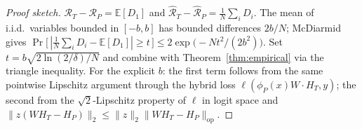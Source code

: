 \begin{proof}[Proof sketch]
$\mathcal{R}_T-\mathcal{R}_P=\mathbb{E}[D_1]$ and
$\widehat{\mathcal{R}}_T-\widehat{\mathcal{R}}_P=\tfrac1N\sum_i D_i$.
The mean of i.i.d.\ variables bounded in $[-b,b]$ has bounded differences
$2b/N$; McDiarmid gives
$\Pr\bigl[\,|\tfrac1N\sum_i D_i-\mathbb{E}[D_1]|\ge t\,\bigr]
\le 2\exp\!\bigl(-N t^2/(2b^2)\bigr)$.
Set $t=b\sqrt{2\ln(2/\delta)/N}$ and combine with
Theorem~\ref{thm:empirical} via the triangle inequality.
For the explicit $b$: the first term follows from the same pointwise
Lipschitz argument through the hybrid loss
$\ell(\phi_P(x)W\!\cdot\!H_T,y)$; the second from the $\sqrt2$-Lipschitz
property of $\ell$ in logit space and
$\|z(WH_T-H_P)\|_2\le\|z\|_2\|WH_T-H_P\|_{\mathrm{op}}$.
\end{proof}

